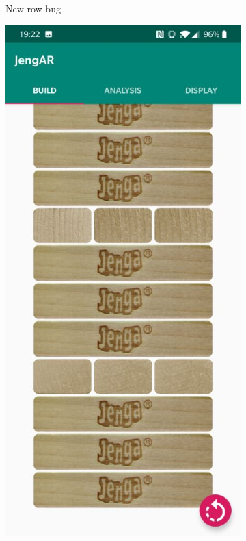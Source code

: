 \begin{figure}[ht]
\begin{subfigure}{0.3\textwidth}
\caption{New row bug} \label{fig:uibug1}
\end{subfigure}
\hspace*{\fill}
\begin{subfigure}{0.3\textwidth}
\includegraphics[width=\linewidth]{images/evaluation/uibug2.jpg}

\end{subfigure}
\end{figure}
